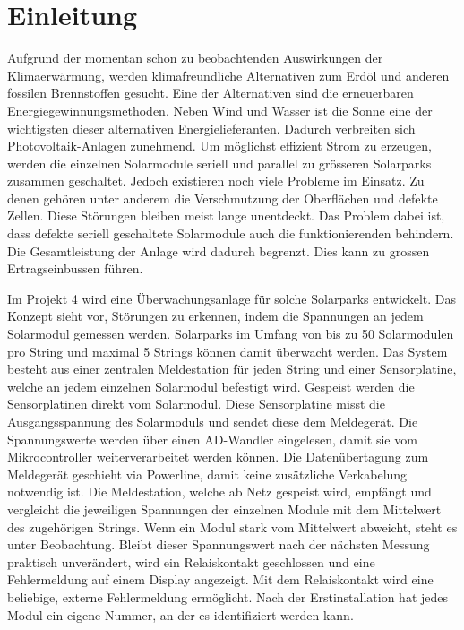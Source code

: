 \section{Einleitung}


Aufgrund der momentan schon zu beobachtenden Auswirkungen der Klimaerwärmung, werden klimafreundliche Alternativen zum Erdöl und anderen fossilen Brennstoffen gesucht. Eine der Alternativen sind die erneuerbaren Energiegewinnungsmethoden. Neben Wind und Wasser ist die Sonne eine der wichtigsten dieser alternativen Energielieferanten. Dadurch verbreiten sich Photovoltaik-Anlagen zunehmend. Um möglichst effizient Strom zu erzeugen, werden die einzelnen Solarmodule seriell und parallel zu grösseren Solarparks zusammen geschaltet. Jedoch existieren noch viele Probleme im Einsatz. Zu denen gehören unter anderem die Verschmutzung der Oberflächen und defekte Zellen. Diese Störungen bleiben meist lange unentdeckt. Das Problem dabei ist, dass defekte seriell geschaltete Solarmodule auch die funktionierenden behindern. Die Gesamtleistung der Anlage wird dadurch begrenzt. Dies kann zu grossen Ertragseinbussen führen.


Im Projekt 4 wird eine Überwachungsanlage für solche Solarparks entwickelt. Das Konzept sieht vor, Störungen zu erkennen, indem die Spannungen an jedem Solarmodul gemessen werden. Solarparks im Umfang von bis zu 50 Solarmodulen pro String und maximal 5 Strings können damit überwacht werden. Das System besteht aus einer zentralen Meldestation für jeden String und einer Sensorplatine, welche an jedem einzelnen Solarmodul befestigt wird. Gespeist werden die Sensorplatinen direkt vom Solarmodul. Diese Sensorplatine misst die Ausgangsspannung des Solarmoduls und sendet diese dem Meldegerät. Die Spannungswerte werden über einen AD-Wandler eingelesen, damit sie vom Mikrocontroller weiterverarbeitet werden können. Die Datenübertagung zum Meldegerät geschieht via Powerline, damit keine zusätzliche Verkabelung notwendig ist. Die Meldestation, welche ab Netz gespeist wird, empfängt und vergleicht die jeweiligen Spannungen der einzelnen Module mit dem Mittelwert des zugehörigen Strings. Wenn ein Modul stark vom Mittelwert abweicht, steht es unter Beobachtung. Bleibt dieser Spannungswert nach der nächsten Messung praktisch unverändert, wird ein Relaiskontakt geschlossen und eine Fehlermeldung auf einem Display angezeigt. Mit dem Relaiskontakt wird eine beliebige, externe Fehlermeldung ermöglicht. Nach der Erstinstallation hat jedes Modul ein eigene Nummer, an der es identifiziert werden kann.
